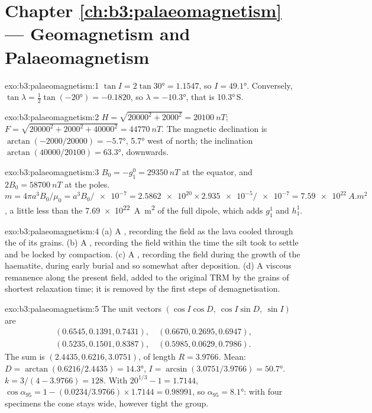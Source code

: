 \section*{Chapter \ref{ch:b3:palaeomagnetism} --- Geomagnetism and Palaeomagnetism}

\begin{solution}{exo:b3:palaeomagnetism:1}
$\tan I = 2\tan\ang{30} = 1.1547$, so $I = \ang{49.1}$. Conversely, $\tan\lambda
= \tfrac12\tan(\ang{-20}) = -0.1820$, so $\lambda = \ang{-10.3}$, that is
\ang{10.3}\,S.
\end{solution}

\begin{solution}{exo:b3:palaeomagnetism:2}
$H = \sqrt{20000^2 + 2000^2} = \qty{20100}{nT}$;
$F = \sqrt{20000^2 + 2000^2 + 40000^2} = \qty{44770}{nT}$. The magnetic
declination is $\arctan(-2000/20000) = \ang{-5.7}$, \ang{5.7} west of north;
the inclination $\arctan(40000/20100) = \ang{63.3}$, downwards.
\end{solution}

\begin{solution}{exo:b3:palaeomagnetism:3}
$B_0 = -g_1^0 = \qty{29350}{nT}$ at the equator, and $2B_0 = \qty{58700}{nT}$ at
the poles. $m = 4\pi a^3B_0/\mu_0 = a^3B_0/\num{e-7} = \num{2.5862e20}\times
\num{2.935e-5}/\num{e-7} = \qty{7.59e22}{A.m^2}$, a little less than the
\qty{7.69e22}{A.m^2} of the full dipole, which adds $g_1^1$ and $h_1^1$.
\end{solution}

\begin{solution}{exo:b3:palaeomagnetism:4}
(a) A , recording the field as the lava cooled
through the  of its grains. (b) A , recording the field within the time the silt took to settle and
be locked by compaction. (c) A , recording the
field during the growth of the haematite, during early burial and so somewhat
after deposition. (d) A viscous remanence along the present field, added to the
original TRM by the grains of shortest relaxation time; it is removed by the
first steps of demagnetisation.
\end{solution}

\begin{solution}{exo:b3:palaeomagnetism:5}
The unit vectors $(\cos I\cos D,\ \cos I\sin D,\ \sin I)$ are
\begin{gather*}
  (0.6545, 0.1391, 0.7431),\quad (0.6670, 0.2695, 0.6947),\\
  (0.5235, 0.1501, 0.8387),\quad (0.5985, 0.0629, 0.7986).
\end{gather*}
The sum is $(2.4435, 0.6216, 3.0751)$, of length $R = 3.9766$. Mean:
$D = \arctan(0.6216/2.4435) = \ang{14.3}$, $I = \arcsin(3.0751/3.9766) =
\ang{50.7}$. $k = 3/(4 - 3.9766) = 128$. With $20^{1/3} - 1 = 1.7144$,
$\cos\alpha_{95} = 1 - (0.0234/3.9766)\times1.7144 = 0.98991$, so
$\alpha_{95} = \ang{8.1}$: with four specimens the cone stays wide, however
tight the group.
\end{solution}

